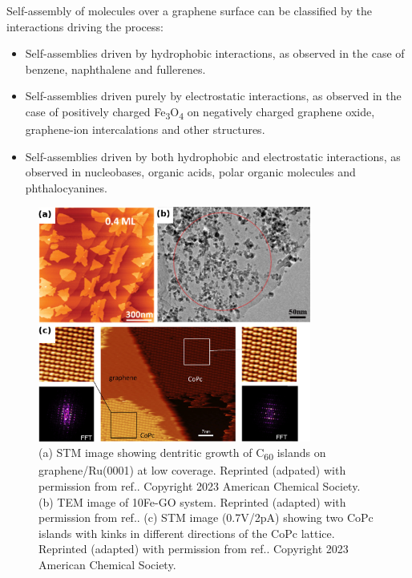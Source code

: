 Self-assembly of molecules over a graphene surface can be classified by the interactions driving the process:
\begin{itemize}
    \item Self-assemblies driven by hydrophobic interactions, as observed in the case of benzene\cite{alzahrani_first-principles_2010,shen_adsorption_2021,hassan_interactions_2014,wang_substituent_2014}, naphthalene and fullerenes\cite{lu_using_2012}.
    \item Self-assemblies driven purely by electrostatic interactions, as observed in the case of positively charged Fe\textsubscript{3}O\textsubscript{4} on negatively charged graphene oxide\cite{yang_electrostatic_2020}, graphene-ion intercalations\cite{lee_li_2012,yoon_chloroaluminate_2022,yu_reversible_2023,ji_lithium_2019} and other structures\cite{groger_step-wise_2009}. 
    \item Self-assemblies driven by both hydrophobic and electrostatic interactions, as observed in nucleobases\cite{heckl_two-dimensional_1991,freund_structure_1997,mu_temperature-dependent_2013,gottarelli_self-assembly_2000,ciesielski_nanopatterning_2010}, organic acids\cite{rochefort_interaction_2009,griessl_self-assembled_2002}, polar organic molecules\cite{song_noncovalent_2016,su_composites_2009} and phthalocyanines\cite{jarvinen_self-assembly_2014,hamalainen_self-assembly_2012}.
\end{itemize}

\begin{figure}[h]
    \centering
    \includegraphics[width=0.8\textwidth]{Introduction/Figures/Untitled_new.png}
    \caption[Representative images depicting various types of self-assemblies formed over a graphene surface]{(a) STM image showing dentritic growth of C\textsubscript{60} islands on graphene/Ru(0001) at low coverage. Reprinted (adpated) with permission from ref.\supercite{lu_using_2012}. Copyright 2023 American Chemical Society. (b) TEM image of 10Fe-GO system. Reprinted (adapted) with permission from ref.\supercite{yang_electrostatic_2020}. (c) STM image (0.7V/2pA) showing two CoPc islands with kinks in different directions of the CoPc lattice. Reprinted (adapted) with permission from ref.\supercite{hamalainen_self-assembly_2012}. Copyright 2023 American Chemical Society.}
    \label{fig:enter-label}
\end{figure}

